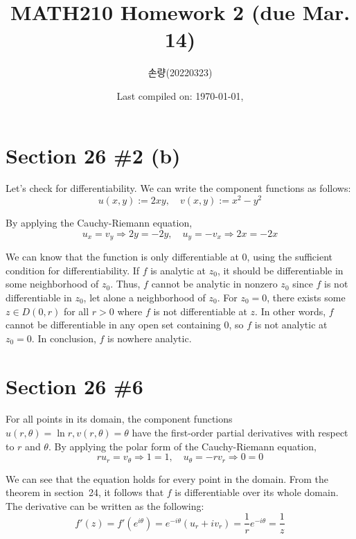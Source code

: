 \documentclass{scrartcl}
\title{MATH210 Homework 2 (due Mar. 14)}
\author{손량(20220323)}
\date{Last compiled on: \today, \currenttime}
\begin{document}
\maketitle

\section{Section 26 \#2 (b)}
Let's check for differentiability.
We can write the component functions as follows:
\[
  u(x, y) := 2xy, \quad v(x, y) := x^2 - y^2
\]

By applying the Cauchy-Riemann equation,
\[
  u_x = v_y \Longrightarrow 2y = -2y, \quad u_y = -v_x \Longrightarrow 2x = -2x
\]

We can know that the function is only differentiable at \(0\), using the sufficient condition for differentiability.
If \(f\) is analytic at \(z_0\), it should be differentiable in some neighborhood of \(z_0\).
Thus, \(f\) cannot be analytic in nonzero \(z_0\) since \(f\) is not differentiable in \(z_0\), let alone a neighborhood of \(z_0\).
For \(z_0 = 0\), there exists some \(z \in D(0, r)\) for all \(r > 0\) where \(f\) is not differentiable at \(z\).
In other words, \(f\) cannot be differentiable in any open set containing \(0\), so \(f\) is not analytic at \(z_0 = 0\).
In conclusion, \(f\) is nowhere analytic.

\section{Section 26 \#6}
For all points in its domain, the component functions \(u(r, \theta) = \ln r, v(r, \theta) = \theta\) have the first-order partial derivatives with respect to \(r\) and \(\theta\).
By applying the polar form of the Cauchy-Riemann equation,
\[
  ru_r = v_\theta \Longrightarrow 1 = 1, \quad u_\theta = -rv_r \Longrightarrow 0 = 0
\]

We can see that the equation holds for every point in the domain.
From the theorem in section~24, it follows that \(f\) is differentiable over its whole domain.
The derivative can be written as the following:
\[
  f'(z) = f'(e^{i\theta}) = e^{-i\theta} (u_r + iv_r) = \frac{1}{r} e^{-i\theta} = \frac{1}{z}
\]
\end{document}
